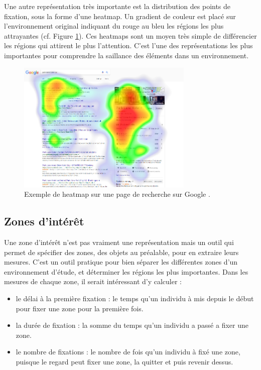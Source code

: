 \documentclass[12pt]{article}
\begin{document}
Une autre représentation très importante est la distribution des points de
fixation, sous la forme d'une heatmap. Un gradient de couleur est placé sur
l'environnement original indiquant du rouge au bleu les régions les plus
attrayantes (cf. Figure \ref{fig:heatmap}). Ces heatmaps sont un moyen très
simple de différencier les régions qui attirent le plus l'attention. C'est
l'une des représentations les plus importantes pour comprendre la saillance des
éléments dans un environnement.

\begin{figure}[ht]
  \centering
  \includegraphics[width=0.75\textwidth,keepaspectratio=true]{heatmap.png}
  \caption{Exemple de heatmap sur une page de recherche sur Google
    \cite{img:heatmap}.}
  \label{fig:heatmap}
\end{figure}

\subsection{Zones d'intérêt}

Une zone d'intérêt n'est pas vraiment une représentation mais un outil qui
permet de spécifier des zones, des objets au préalable, pour en extraire leurs
mesures. C'est un outil pratique pour bien séparer les différentes zones d'un
environnement d'étude, et déterminer les régions les plus importantes. Dans les
mesures de chaque zone, il serait intéressant d'y calculer :

\begin{itemize}
  \item le délai à la première fixation : le temps qu'un individu à mis
        depuis le début pour fixer une zone pour la première fois.
  \item la durée de fixation : la somme du temps qu'un individu a passé a
        fixer une zone.
  \item le nombre de fixations : le nombre de fois qu'un individu à fixé
        une zone, puisque le regard peut fixer une zone, la quitter et
        puis revenir dessus.
\end{itemize}
\end{document}
